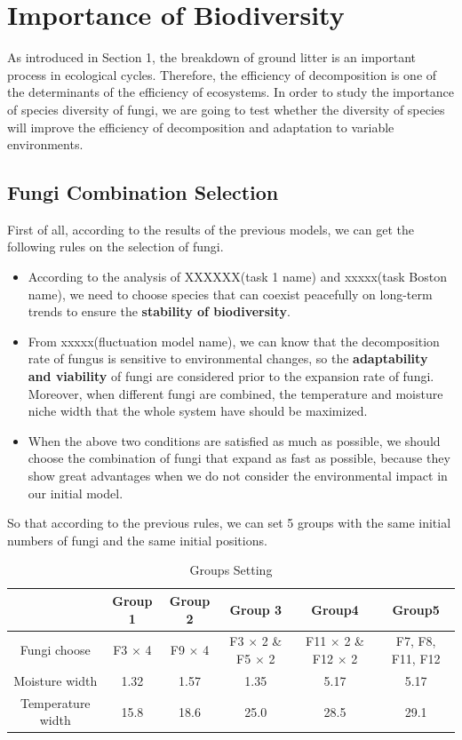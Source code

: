 \documentclass[a4paper,12pt]{article}
\begin{document}
\section{Importance of Biodiversity}

\par As introduced in Section 1, the breakdown of ground litter is an important process in ecological cycles. Therefore, the efficiency of decomposition is one of the determinants of the efficiency of ecosystems. In order to study the importance of species diversity of fungi, we are going to test whether the diversity of species will improve the efficiency of decomposition and adaptation to variable environments.
\subsection{Fungi Combination Selection}
\par First of all, according to the results of the previous models, we can get the following rules on the selection of fungi.
\begin{itemize}
\setlength{\itemsep}{0ex} %
	\item According to the analysis of XXXXXX(task 1 name) and xxxxx(task Boston name), we need to choose species that can coexist peacefully on long-term trends to ensure the \textbf{stability of biodiversity}.
	\item From xxxxx(fluctuation model name), we can know that the decomposition rate of fungus is sensitive to environmental changes, so the \textbf{adaptability and viability} of fungi are considered prior to the expansion rate of fungi. Moreover, when different fungi are combined, the temperature and moisture niche width that the whole system have should be maximized.
	\item When the above two conditions are satisfied as much as possible, we should choose the combination of fungi that expand as fast as possible, because they show great advantages when we do not consider the environmental impact in our initial model.	
\end{itemize}
\par So that according to the previous rules, we can set 5 groups with the same initial numbers of fungi and the same initial positions. 
\vspace{-0.3cm}
\begin{table}[H]
	\centering
	\caption{Groups Setting}
	\begin{tabular}{|c|c|c|c|c|c|}
		\hline
		&Group 1 & Group 2 & Group 3 & Group4& Group5\\
		\hline 
		Fungi choose&F3 $\times$ 4 & F9 $\times$ 4 & F3 $\times$ 2 \& F5 $\times$ 2 &  F11 $\times$ 2 \& F12 $\times$ 2 & F7, F8, F11, F12\\
		\hline
		Moisture width &1.32&1.57&1.35&5.17&5.17 \\
		\hline
		Temperature width &15.8&18.6&25.0&28.5&29.1 \\
		\hline
	\end{tabular}
\end{table}
\end{document}
